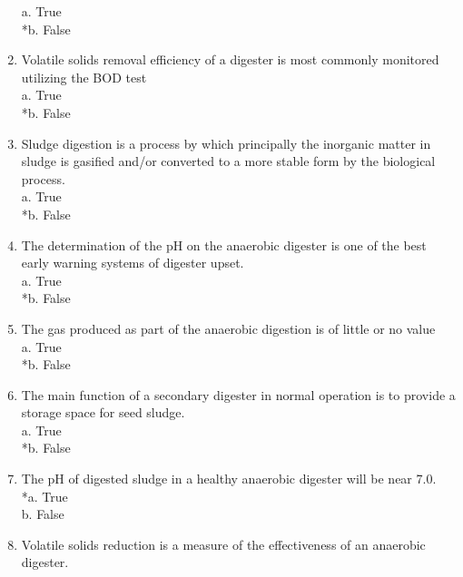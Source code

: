 \begin{enumerate}
a. True \\
*b. False \\

\item  Volatile solids removal efficiency of a digester is most commonly monitored utilizing the BOD test\\

a. True \\
*b. False \\

\item  Sludge digestion is a process by which principally the inorganic matter in sludge is gasified and/or converted to a more stable form by the biological process. \\

a. True \\
*b. False \\

\item  The determination of the pH on the anaerobic digester is one of the best early warning systems of digester upset. \\

a. True \\
*b. False \\

\item  The gas produced as part of the anaerobic digestion is of little or no value \\

a. True \\
*b. False \\

\item  The main function of a secondary digester in normal operation is to provide a storage space for seed sludge. \\

a. True \\
*b. False \\

\item  The pH of digested sludge in a healthy anaerobic digester will be near 7.0. \\

*a. True \\
b. False \\

\item  Volatile solids reduction is a measure of the effectiveness of an anaerobic digester. \\


\end{enumerate}
